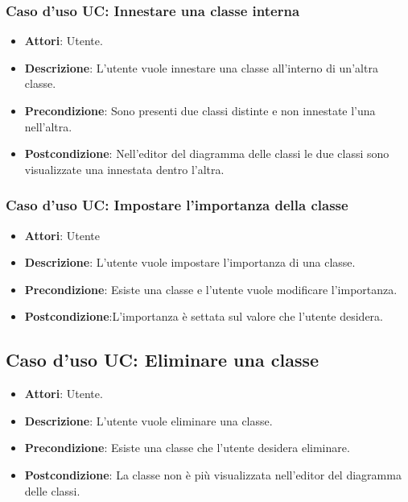 \documentclass[../AnalisiDeiRequisiti.tex]{subfiles}
\begin{document}
		
		
		\subsubsection{Caso d'uso UC: Innestare una classe interna}
		\begin{itemize}
			\item\textbf{Attori}: Utente.
			\item\textbf{Descrizione}: L'utente vuole innestare una classe all'interno di un'altra classe.
			\item\textbf{Precondizione}: Sono presenti due classi distinte e non innestate l'una nell'altra.
			\item\textbf{Postcondizione}: Nell'editor del diagramma delle classi le due classi sono visualizzate una innestata dentro l'altra.	
		\end{itemize}
		
		\subsubsection{Caso d'uso UC: Impostare l'importanza della classe}
		\begin{itemize}
			\item\textbf{Attori}: Utente
			\item\textbf{Descrizione}: L'utente vuole impostare l'importanza di una classe.
			\item\textbf{Precondizione}: Esiste una classe e l'utente vuole modificare l'importanza.
			\item\textbf{Postcondizione}:L'importanza è settata sul valore che l'utente desidera.
		\end{itemize}
		
		\subsection{Caso d'uso UC: Eliminare una classe}
		\begin{itemize}
			\item\textbf{Attori}: Utente.
			\item\textbf{Descrizione}: L'utente vuole eliminare una classe.
			\item\textbf{Precondizione}: Esiste una classe che l'utente desidera eliminare.
			\item\textbf{Postcondizione}: La classe non è più visualizzata nell'editor del diagramma delle classi.
		\end{itemize}
		
\end{document}
